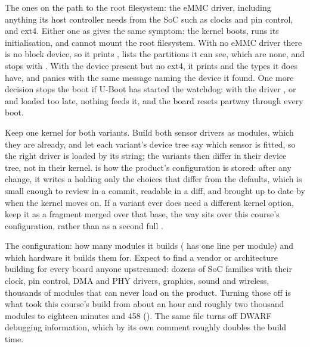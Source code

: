 The ones on the path to the root filesystem: the eMMC driver, including anything its
host controller needs from the SoC such as clocks and pin control, and ext4. Either one as
 gives the same symptom: the kernel boots, runs its initialisation, and cannot mount the
root filesystem. With no eMMC driver there is no block device, so it prints , lists the partitions it can see, which are none, and stops with . With the device present but no
ext4, it prints  and the types it does have, and
panics with the same message naming the device it found. One more decision stops the boot if
U-Boot has started the watchdog: with the driver , or  and loaded too late,
nothing feeds it, and the board resets partway through every boot.

 Keep one kernel for both variants. Build both sensor drivers as modules, which they are
already, and let each variant's device tree say which sensor is fitted, so the right driver is
loaded by its  string; the variants then differ in their device tree, not in their
kernel.  is how the product's configuration is stored: after any change, it
writes a  holding only the choices that differ from the defaults, which is small
enough to review in a commit, readable in a diff, and brought up to date by  when
the kernel moves on. If a variant ever does need a different kernel option, keep it as a fragment
merged over that base, the way  sits over this course's configuration, rather
than as a second full .

 The configuration: how many modules it builds ( has one line per
module) and which hardware it builds them for. Expect to find a vendor or architecture
 building for every board anyone upstreamed: dozens of SoC families with their
clock, pin control, DMA and PHY drivers, graphics, sound and wireless, thousands of modules that can
never load on the product. Turning those off is what took this course's build from about an hour
and roughly two thousand modules to eighteen minutes and 458 (). The same file
turns off DWARF debugging information, which by its own comment roughly doubles the build time.


